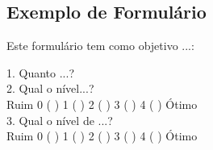 \documentclass[
	12pt,				%
	oneside,
	a4paper,			%
    sumario=tradicional,%
	chapter=TITLE,		%
	english,			%
	french,				%
	spanish,			%
	brazil,				%
	]{abntex2}
\begin{document}
\postextual



%
%






\begin{anexosenv}

\partanexos

\chapter{Exemplo de Formulário}\label{anexo:formAluno}

Este formulário tem como objetivo ...:

1.	Quanto ...?\\


2.	Qual o nível...?\\
Ruim 0 (   )      1 (   )     2 (   )      3 (    )     4 (   )	Ótimo\\


3.	Qual o nível de ...?\\
Ruim 0 (   )      1 (   )     2 (   )      3 (    )     4 (   )	Ótimo\\	



\end{anexosenv}

\printindex
\end{document}
